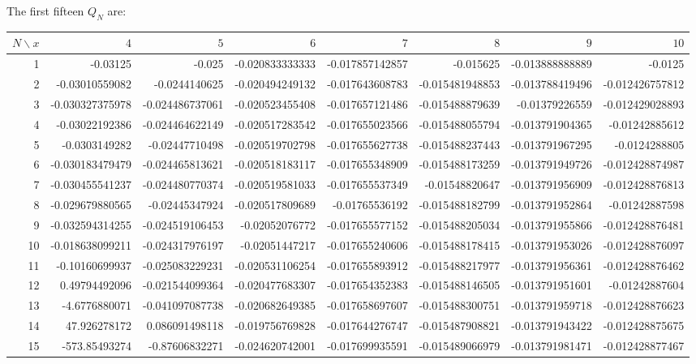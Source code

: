 The first fifteen $Q_N$ are:
\begin{center}\begingroup\scriptsize\setlength{\tabcolsep}{1.5pt}
\begin{tabular}{r r r r r r r r}
\toprule
$N\backslash x$ & $4$ & $5$ & $6$ & $7$ & $8$ & $9$ & $10$\\
\midrule
1 & -0.03125 & -0.025 & -0.020833333333 & -0.017857142857 & -0.015625 & -0.013888888889 & -0.0125 \\
2 & -0.03010559082 & -0.0244140625 & -0.020494249132 & -0.017643608783 & -0.015481948853 & -0.013788419496 & -0.012426757812 \\
3 & -0.030327375978 & -0.024486737061 & -0.020523455408 & -0.017657121486 & -0.015488879639 & -0.01379226559 & -0.012429028893 \\
4 & -0.03022192386 & -0.024464622149 & -0.020517283542 & -0.017655023566 & -0.015488055794 & -0.013791904365 & -0.01242885612 \\
5 & -0.0303149282 & -0.02447710498 & -0.020519702798 & -0.017655627738 & -0.015488237443 & -0.013791967295 & -0.0124288805 \\
6 & -0.030183479479 & -0.024465813621 & -0.020518183117 & -0.017655348909 & -0.015488173259 & -0.013791949726 & -0.012428874987 \\
7 & -0.030455541237 & -0.024480770374 & -0.020519581033 & -0.017655537349 & -0.01548820647 & -0.013791956909 & -0.012428876813 \\
8 & -0.029679880565 & -0.02445347924 & -0.020517809689 & -0.01765536192 & -0.015488182799 & -0.013791952864 & -0.01242887598 \\
9 & -0.032594314255 & -0.024519106453 & -0.02052076772 & -0.017655577152 & -0.015488205034 & -0.013791955866 & -0.012428876481 \\
10 & -0.018638099211 & -0.024317976197 & -0.02051447217 & -0.017655240606 & -0.015488178415 & -0.013791953026 & -0.012428876097 \\
11 & -0.10160699937 & -0.025083229231 & -0.020531106254 & -0.017655893912 & -0.015488217977 & -0.013791956361 & -0.012428876462 \\
12 & 0.49794492096 & -0.021544099364 & -0.020477683307 & -0.017654352383 & -0.015488146505 & -0.013791951601 & -0.01242887604 \\
13 & -4.6776880071 & -0.041097087738 & -0.020682649385 & -0.017658697607 & -0.015488300751 & -0.013791959718 & -0.012428876623 \\
14 & 47.926278172 & 0.086091498118 & -0.019756769828 & -0.017644276747 & -0.015487908821 & -0.013791943422 & -0.012428875675 \\
15 & -573.85493274 & -0.87606832271 & -0.024620742001 & -0.017699935591 & -0.015489066979 & -0.013791981471 & -0.012428877467 \\
\bottomrule
\end{tabular}\endgroup\end{center}
